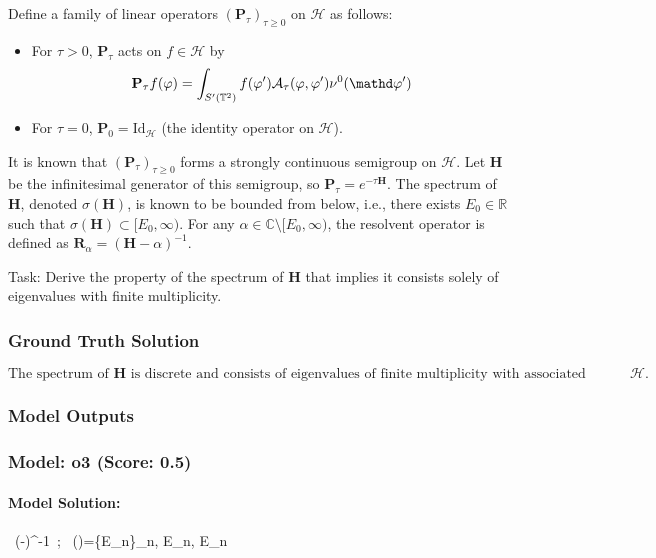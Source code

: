 \documentclass[10pt]{article}
\begin{document}
Define a family of linear operators $(\mathbf{P}_\tau)_{\tau \geq 0}$ on $\mathcal{H}$ as follows:
\begin{itemize}
    \item For $\tau > 0$, $\mathbf{P}_\tau$ acts on $f \in \mathcal{H}$ by
    $$ \mathbf{P}_\tau f(\varphi) = \int_{S'(\mathbb{T}^2)} f(\varphi') \mathcal{A}_\tau(\varphi, \varphi') \nu^0(\mathd\varphi') $$
    \item For $\tau = 0$, $\mathbf{P}_0 = \mathrm{Id}_{\mathcal{H}}$ (the identity operator on $\mathcal{H}$).
\end{itemize}
It is known that $(\mathbf{P}_\tau)_{\tau \geq 0}$ forms a strongly continuous semigroup on $\mathcal{H}$. Let $\mathbf{H}$ be the infinitesimal generator of this semigroup, so $\mathbf{P}_\tau = e^{-\tau \mathbf{H}}$. The spectrum of $\mathbf{H}$, denoted $\sigma(\mathbf{H})$, is known to be bounded from below, i.e., there exists $E_0 \in \mathbb{R}$ such that $\sigma(\mathbf{H}) \subset [E_0, \infty)$. For any $\alpha \in \mathbb{C} \setminus [E_0, \infty)$, the resolvent operator is defined as $\mathbf{R}_\alpha = (\mathbf{H} - \alpha)^{-1}$.

Task:
Derive the property of the spectrum of $\mathbf{H}$ that implies it consists solely of eigenvalues with finite multiplicity.

\subsubsection*{Ground Truth Solution}
\[ \boxed{\text{The spectrum of } \mathbf{H} \text{ is discrete and consists of eigenvalues of finite multiplicity with associated eigenvectors that form an orthonormal basis of } \mathcal{H}.} \]

\subsubsection*{Model Outputs}
\subsubsection*{Model: o3 (Score: 0.5)}
\paragraph*{Model Solution:}
\;
\ (-\alpha)^{-1}\ ;\; 
\Longrightarrow\ \sigma()=\{E_n\}_{n\in{}},\;
E_n\!\uparrow\!\infty,\; E_n\;
\end{document}
